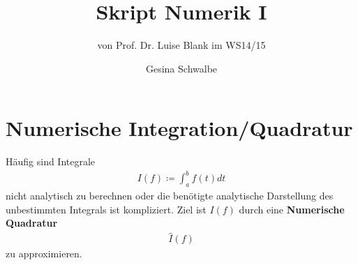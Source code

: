 \documentclass[ngerman,fontsize=11pt, paper=a4, parskip=half, titlepage=true, toc=bib]{scrbook}
\begin{document}
\frontmatter	%
\title{Skript Numerik I}
\subtitle{von Prof. Dr. Luise Blank im WS14/15}
\author{Gesina Schwalbe}
\maketitle
\tableofcontents


\mainmatter		%
















\chapter{Numerische Integration/Quadratur}


Häufig sind Integrale
\begin{gather*}
  I(f) \coloneqq \int_a^bf(t)dt
\end{gather*}
nicht analytisch zu berechnen
oder die benötigte analytische Darstellung
des unbestimmten Integrals ist kompliziert.
Ziel ist $I(f)$ durch eine 
\textbf{Numerische Quadratur}
\begin{gather*}
  \hat{I}(f)
\end{gather*}
zu approximieren.
\end{document}
